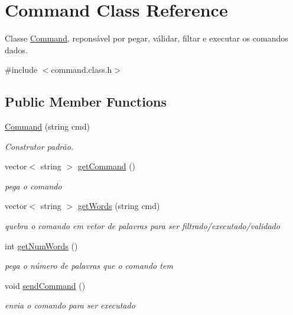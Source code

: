 \hypertarget{classCommand}{}\section{Command Class Reference}
\label{classCommand}


Classe \hyperlink{classCommand}{Command}, reponsável por pegar, válidar, filtar e executar os comandos dados.  




{\ttfamily \#include $<$command.\+class.\+h$>$}

\subsection*{Public Member Functions}
\begin{DoxyCompactItemize}
\item 
\hyperlink{classCommand_aa66130359570f527b42300633e35f8c2}{Command} (string cmd)
\begin{DoxyCompactList}\small\item\em Construtor padrão. \end{DoxyCompactList}\item 
vector$<$ string $>$ \hyperlink{classCommand_aadc7d1f81a2f438f53c15f31e77ba8aa}{get\+Command} ()
\begin{DoxyCompactList}\small\item\em pega o comando \end{DoxyCompactList}\item 
vector$<$ string $>$ \hyperlink{classCommand_a591435fa9400bb5c13150092ee3b1c70}{get\+Words} (string cmd)
\begin{DoxyCompactList}\small\item\em quebra o comando em vetor de palavras para ser filtrado/executado/validado \end{DoxyCompactList}\item 
int \hyperlink{classCommand_a966fc59f6572e832e85b1791479714c4}{get\+Num\+Words} ()
\begin{DoxyCompactList}\small\item\em pega o número de palavras que o comando tem \end{DoxyCompactList}\item 
void \hyperlink{classCommand_a911de585d69707fce024dcbdd7bba32f}{send\+Command} ()
\begin{DoxyCompactList}\small\item\em envia o comando para ser executado \end{DoxyCompactList}\item 

\end{DoxyCompactItemize}
